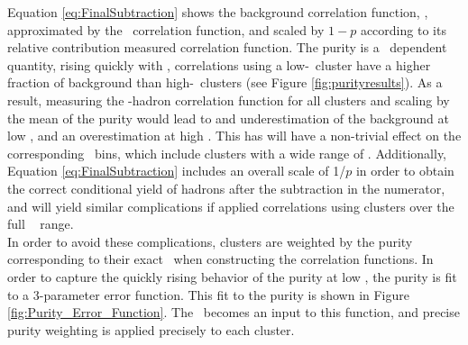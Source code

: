 Equation \ref{eq:FinalSubtraction} shows the background correlation function, \CB, approximated by the \ydecay~correlation function, and scaled by $1-p$ according to its relative contribution measured correlation function. The purity is a \pt~dependent quantity, rising quickly with \pt, correlations using a low-\pt~cluster have a higher fraction of background than high-\pt~clusters (see Figure \ref{fig:purityresults}). As a result, measuring the \ydecay-hadron correlation function for all clusters and scaling by the mean of the purity would lead to and underestimation of the background at low \ptcluster, and an overestimation at high \ptcluster. This has will have a non-trivial effect on the corresponding \zt~bins, which include clusters with a wide range of \ptcluster. Additionally,  Equation \ref{eq:FinalSubtraction} includes an overall scale of 1/$p$ in order to obtain the correct conditional yield of hadrons after the subtraction in the numerator, and will yield similar complications if applied correlations using clusters over the full \ptcluster~ range.\\

In order to avoid these complications, clusters are weighted by the purity corresponding to their exact \ptcluster~when constructing the correlation functions. In order to capture the quickly rising behavior of the purity at low \ptcluster, the purity is fit to a 3-parameter error function. This fit to the purity is shown in Figure \ref{fig:Purity_Error_Function}. The \ptcluster~becomes an input to this function, and precise purity weighting is applied precisely to each cluster. 

